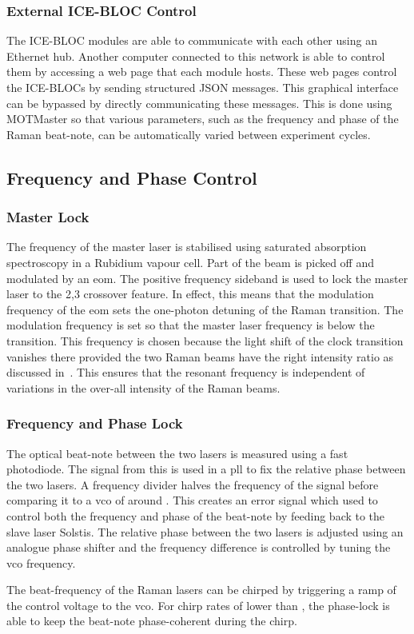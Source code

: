\subsubsection{External ICE-BLOC Control}
The ICE-BLOC modules are able to communicate with each other using an Ethernet
hub. Another computer connected to this network is able to control them by
accessing a web page that each module hosts. These web pages control the ICE-BLOCs
by sending structured JSON messages. This graphical interface can be bypassed by
directly communicating these messages. This is done using MOTMaster so that
various parameters, such as the frequency and phase of the Raman beat-note, can
be automatically varied between experiment cycles. 
\subsection{Frequency and Phase Control}\label{subsec:msquared_control}

\subsubsection{Master Lock}
The frequency of the master laser is stabilised using saturated absorption
spectroscopy in a Rubidium vapour cell. Part of the beam is picked off and
modulated by an \ac{eom}. The positive frequency sideband is used to lock the
master laser to the 2,3 crossover feature. In effect, this means that the
modulation frequency of the \ac{eom} sets the one-photon detuning of the Raman
transition. The modulation frequency is set so that the master laser frequency
is  below the  transition. This
frequency is chosen because the light shift of the clock transition
vanishes there provided the two Raman beams have the right intensity
ratio as discussed in~. This ensures
that the resonant frequency is independent of variations in the
over-all intensity of the Raman beams.
\subsubsection{Frequency and Phase Lock} The optical beat-note between the two
lasers is measured using a fast photodiode. The signal from this is used in a
\ac{pll} to fix the relative phase between the two lasers. A frequency
divider halves the frequency of the signal before comparing it to a \ac{vco} of
around . This creates an error signal which used to
control both the frequency and phase of the beat-note by feeding back to the
slave laser Solstis. The relative phase between the two lasers is adjusted using
an analogue phase shifter and the frequency difference is controlled by tuning
the \ac{vco} frequency. \par\noindent The beat-frequency of the Raman lasers can
be chirped by triggering a ramp of the control voltage to the \ac{vco}. For
chirp rates of lower than , the phase-lock
is able to keep the beat-note phase-coherent during the chirp.  
